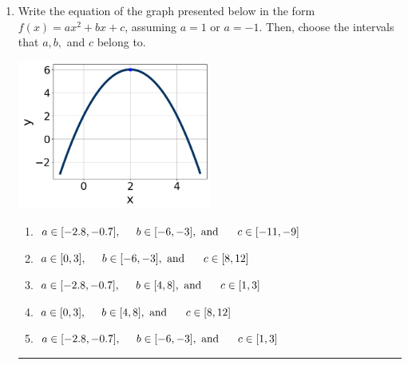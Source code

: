 \documentclass[14pt]{extbook}
\newcommand{\litem}[1]{\item#1\hspace*{-1cm}\rule{\textwidth}{0.4pt}}
\begin{document}
\begin{enumerate}
{\begin{enumerate}[label=\Alph*.]
\end{enumerate} }
\litem{
Write the equation of the graph presented below in the form $f(x)=ax^2+bx+c$, assuming  $a=1$ or $a=-1$. Then, choose the intervals that $a, b,$ and $c$ belong to.
\begin{center}
    \includegraphics[width=0.5\textwidth]{../Figures/quadraticGraphToEquationCopyB.png}
\end{center}
\begin{enumerate}[label=\Alph*.]
\item \( a \in [-2.8, -0.7], \hspace*{5mm} b \in [-6, -3], \text{ and } \hspace*{5mm} c \in [-11, -9] \)
\item \( a \in [0, 3], \hspace*{5mm} b \in [-6, -3], \text{ and } \hspace*{5mm} c \in [8, 12] \)
\item \( a \in [-2.8, -0.7], \hspace*{5mm} b \in [4, 8], \text{ and } \hspace*{5mm} c \in [1, 3] \)
\item \( a \in [0, 3], \hspace*{5mm} b \in [4, 8], \text{ and } \hspace*{5mm} c \in [8, 12] \)
\item \( a \in [-2.8, -0.7], \hspace*{5mm} b \in [-6, -3], \text{ and } \hspace*{5mm} c \in [1, 3] \)


\end{enumerate}}
\end{enumerate}
\end{document}
